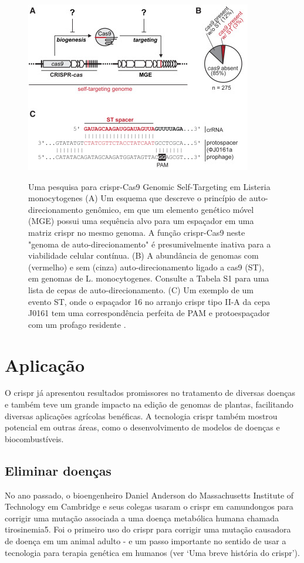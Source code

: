 \documentclass{report}
\begin{document}
\begin{figure}[h]
\center
\includegraphics[scale=1]{gop}
\label{gop}
\caption {Uma pesquisa para \ac{crispr}-Cas9 Genomic Self-Targeting em Listeria monocytogenes (A) Um esquema que descreve o princípio de auto-direcionamento genômico, em que um elemento genético móvel (MGE) possui uma sequência alvo para um espaçador em uma matriz \ac{crispr} no mesmo genoma. A função \ac{crispr}-Cas9 neste "genoma de auto-direcionamento" é presumivelmente inativa para a viabilidade celular contínua.
(B) A abundância de genomas com (vermelho) e sem (cinza) auto-direcionamento ligado a cas9 (ST), em genomas de L. monocytogenes. Consulte a Tabela S1 para uma lista de cepas de auto-direcionamento.
(C) Um exemplo de um evento ST, onde o espaçador 16 no arranjo \ac{crispr} tipo II-A da cepa J0161 tem uma correspondência perfeita de PAM e protoespaçador com um profago residente .}
\end{figure}


\chapter{Aplicação}
\label{chap.aplicação}

O \ac{crispr} já apresentou resultados promissores no tratamento de diversas doenças e também teve um grande impacto na edição de genomas de plantas, facilitando diversas aplicações agrícolas benéficas. A tecnologia \ac{crispr} também mostrou potencial em outras áreas, como o desenvolvimento de modelos de doenças e biocombustíveis. 

\section{Eliminar doenças}

No ano passado, o bioengenheiro Daniel Anderson do Massachusetts Institute of Technology em Cambridge e seus colegas usaram o \ac{crispr} em camundongos para corrigir uma mutação associada a uma doença metabólica humana chamada tirosinemia5. Foi o primeiro uso do \ac{crispr} para corrigir uma mutação causadora de doença em um animal adulto - e um passo importante no sentido de usar a tecnologia para terapia genética em humanos (ver ‘Uma breve história do \ac{crispr}’).
\end{document}
